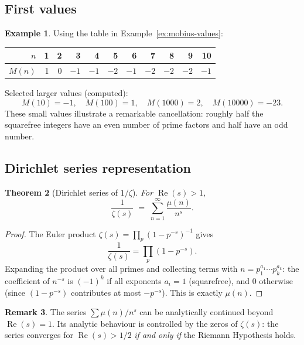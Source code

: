 \documentclass[12pt,a4paper]{amsart}
\newtheorem{theorem}{Theorem}[section]
\theoremstyle{definition}
\newtheorem{example}[theorem]{Example}
\newtheorem{remark}[theorem]{Remark}
\begin{document}
\subsection{First values}

\begin{example}
\label{ex:mertens-values}
Using the table in Example~\ref{ex:mobius-values}:
\begin{center}
\begin{tabular}{r|rrrrrrrrrr}
$n$    & 1 & 2 & 3 & 4 & 5 & 6 & 7 & 8 & 9 & 10 \\
\hline
$M(n)$ & 1 & 0 & $-1$ & $-1$ & $-2$ & $-1$ & $-2$ & $-2$ & $-2$ & $-1$
\end{tabular}
\end{center}

Selected larger values (computed):
\[
  M(10) = -1, \quad M(100) = 1, \quad M(1000) = 2, \quad M(10000) = -23.
\]
These small values illustrate a remarkable cancellation: roughly half the
squarefree integers have an even number of prime factors and half have an odd
number.
\end{example}

\subsection{Dirichlet series representation}

\begin{theorem}[Dirichlet series of $1/\zeta$]
\label{thm:dirichlet-series}
For $\operatorname{Re}(s) > 1$,
\[
  \frac{1}{\zeta(s)} \;=\; \sum_{n=1}^{\infty} \frac{\mu(n)}{n^s}.
\]
\end{theorem}

\begin{proof}
The Euler product $\zeta(s) = \prod_p (1-p^{-s})^{-1}$ gives
\[
  \frac{1}{\zeta(s)} = \prod_p (1 - p^{-s}).
\]
Expanding the product over all primes and collecting terms with $n=p_1^{a_1}
\cdots p_k^{a_k}$: the coefficient of $n^{-s}$ is $(-1)^k$ if all exponents
$a_i=1$ (squarefree), and $0$ otherwise (since $(1-p^{-s})$ contributes at
most $-p^{-s}$).  This is exactly $\mu(n)$.
\end{proof}

\begin{remark}
The series $\sum \mu(n)/n^s$ can be analytically continued beyond
$\operatorname{Re}(s)=1$.  Its analytic behaviour is controlled by the zeros
of $\zeta(s)$: the series converges for $\operatorname{Re}(s) > 1/2$
\emph{if and only if} the Riemann Hypothesis holds.
\end{remark}
\end{document}
